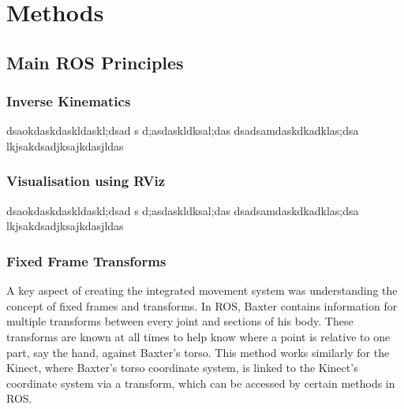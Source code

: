  

\chapter{Methods}
\label{chapter4}
\section{Main ROS Principles}
\subsection{Inverse Kinematics}
dsaokdaskdaskldaskl;dsad
s
d;asdaskldksal;das
dsadsamdaskdkadklas;dsa\newline
lkjsakdsadjksajkdasjldas
\subsection{Visualisation using RViz}
dsaokdaskdaskldaskl;dsad
s
d;asdaskldksal;das
dsadsamdaskdkadklas;dsa\newline
lkjsakdsadjksajkdasjldas
\subsection{Fixed Frame Transforms}
A key aspect of creating the integrated movement system was understanding the concept of fixed frames and transforms. In ROS, Baxter contains information for multiple transforms between every joint and sections of his body. These transforms are known at all times to help know where a point is relative to one part, say the hand, against Baxter's torso. This method works similarly for the Kinect, where Baxter's torso coordinate system, is linked to the Kinect's coordinate system via a transform, which can be accessed by certain methods in ROS.

